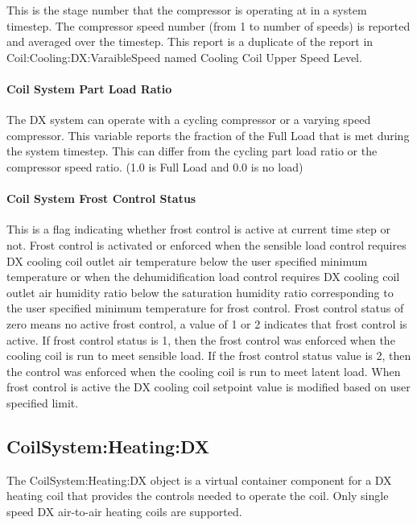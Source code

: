 This is the stage number that the compressor is operating at in a system timestep. The compressor speed number (from 1 to number of speeds) is reported and averaged over the timestep. This report is a duplicate of the report in Coil:Cooling:DX:VaraibleSpeed named Cooling Coil Upper Speed Level.

\paragraph{Coil System Part Load Ratio}\label{coil-system-part-load-ratio}

The DX system can operate with a cycling compressor or a varying speed compressor. This variable reports the fraction of the Full Load that is met during the system timestep. This can differ from the cycling part load ratio or the compressor speed ratio. (1.0 is Full Load and 0.0 is no load)

\paragraph{Coil System Frost Control Status}\label{coil-system-frost-control-status}

This is a flag indicating whether frost control is active at current time step or not. Frost control is activated or enforced when the sensible load control requires DX cooling coil outlet air temperature below the user specified minimum temperature or when the dehumidification load control requires DX cooling coil outlet air humidity ratio below the saturation humidity ratio corresponding to the user specified minimum temperature for frost control. Frost control status of zero means no active frost control, a value of 1 or 2 indicates that frost control is active. If frost control status is 1, then the frost control was enforced when the cooling coil is run to meet sensible load. If the frost control status value is 2, then the control was enforced when the cooling coil is run to meet latent load. When frost control is active the DX cooling coil setpoint value is modified based on user specified limit.

\subsection{CoilSystem:Heating:DX}\label{coilsystemheatingdx}

The CoilSystem:Heating:DX object is a virtual container component for a DX heating coil that provides the controls needed to operate the coil. Only single speed DX air-to-air heating coils are supported.

